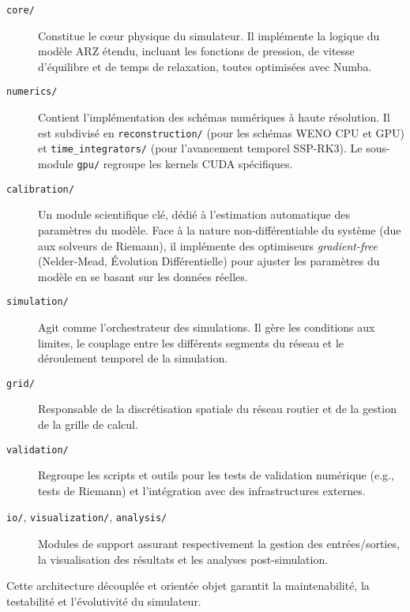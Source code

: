 \begin{description}
       \item[\texttt{core/}] Constitue le cœur physique du simulateur. Il implémente la logique du modèle ARZ étendu, incluant les fonctions de pression, de vitesse d'équilibre et de temps de relaxation, toutes optimisées avec Numba.

       \item[\texttt{numerics/}] Contient l'implémentation des schémas numériques à haute résolution. Il est subdivisé en \texttt{reconstruction/} (pour les schémas WENO CPU et GPU) et \texttt{time\_integrators/} (pour l'avancement temporel SSP-RK3). Le sous-module \texttt{gpu/} regroupe les kernels CUDA spécifiques.

       \item[\texttt{calibration/}] Un module scientifique clé, dédié à l'estimation automatique des paramètres du modèle. Face à la nature non-différentiable du système (due aux solveurs de Riemann), il implémente des optimiseurs \textit{gradient-free} (Nelder-Mead, Évolution Différentielle) pour ajuster les paramètres du modèle en se basant sur les données réelles.

       \item[\texttt{simulation/}] Agit comme l'orchestrateur des simulations. Il gère les conditions aux limites, le couplage entre les différents segments du réseau et le déroulement temporel de la simulation.

       \item[\texttt{grid/}] Responsable de la discrétisation spatiale du réseau routier et de la gestion de la grille de calcul.

       \item[\texttt{validation/}] Regroupe les scripts et outils pour les tests de validation numérique (e.g., tests de Riemann) et l'intégration avec des infrastructures externes.

       \item[\texttt{io/}, \texttt{visualization/}, \texttt{analysis/}] Modules de support assurant respectivement la gestion des entrées/sorties, la visualisation des résultats et les analyses post-simulation.
\end{description}
Cette architecture découplée et orientée objet garantit la maintenabilité, la testabilité et l'évolutivité du simulateur.


